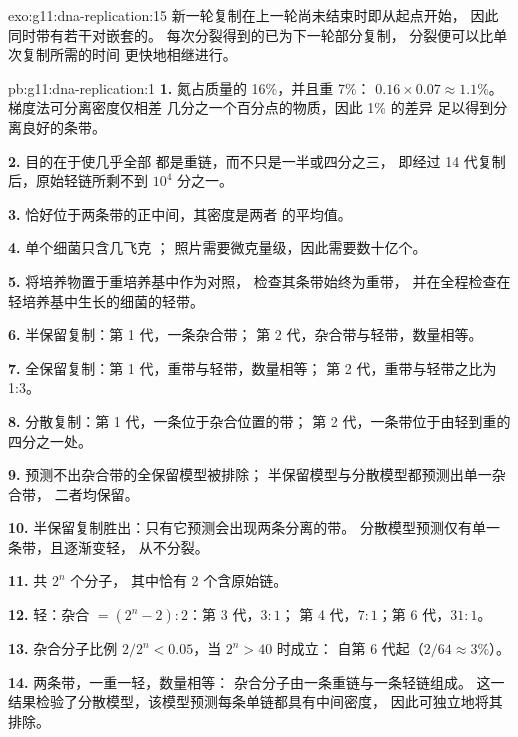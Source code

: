 \begin{solution}{exo:g11:dna-replication:15}
新一轮复制在上一轮尚未结束时即从起点开始，
因此同时带有若干对嵌套的。
每次分裂得到的已为下一轮部分复制，
分裂便可以比单次复制所需的时间
更快地相继进行。
\end{solution}

\begin{solution}{pb:g11:dna-replication:1}
\textbf{1.} 氮占质量的 16\%，并且重 7\%：
$0.16 \times 0.07 \approx 1.1\%$。梯度法可分离密度仅相差
几分之一个百分点的物质，因此 1\% 的差异
足以得到分离良好的条带。

\textbf{2.} 目的在于使几乎全部  都是重链，而不只是一半或四分之三，
即经过 14 代复制后，原始轻链所剩不到
$10^4$ 分之一。

\textbf{3.} 恰好位于两条带的正中间，其密度是两者
的平均值。

\textbf{4.} 单个细菌只含几飞克 ；
照片需要微克量级，因此需要数十亿个。

\textbf{5.} 将培养物置于重培养基中作为对照，
检查其条带始终为重带，
并在全程检查在轻培养基中生长的细菌的轻带。

\textbf{6.} 半保留复制：第 1 代，一条杂合带；
第 2 代，杂合带与轻带，数量相等。

\textbf{7.} 全保留复制：第 1 代，重带与轻带，数量相等；
第 2 代，重带与轻带之比为 1:3。

\textbf{8.} 分散复制：第 1 代，一条位于杂合位置的带；
第 2 代，一条带位于由轻到重的四分之一处。

\textbf{9.} 预测不出杂合带的全保留模型被排除；
半保留模型与分散模型都预测出单一杂合带，
二者均保留。

\textbf{10.} 半保留复制胜出：只有它预测会出现两条分离的带。
分散模型预测仅有单一条带，且逐渐变轻，
从不分裂。

\textbf{11.} 共 $2^n$ 个分子，
其中恰有 2 个含原始链。

\textbf{12.} 轻：杂合 $= (2^n - 2) : 2$：第 3 代，$3:1$；
第 4 代，$7:1$；第 6 代，$31:1$。

\textbf{13.} 杂合分子比例 $2/2^n < 0.05$，当 $2^n > 40$ 时成立：
自第 6 代起（$2/64 \approx 3\%$）。

\textbf{14.} 两条带，一重一轻，数量相等：
杂合分子由一条重链与一条轻链组成。
这一结果检验了分散模型，该模型预测每条单链都具有中间密度，
因此可独立地将其排除。


\end{solution}
